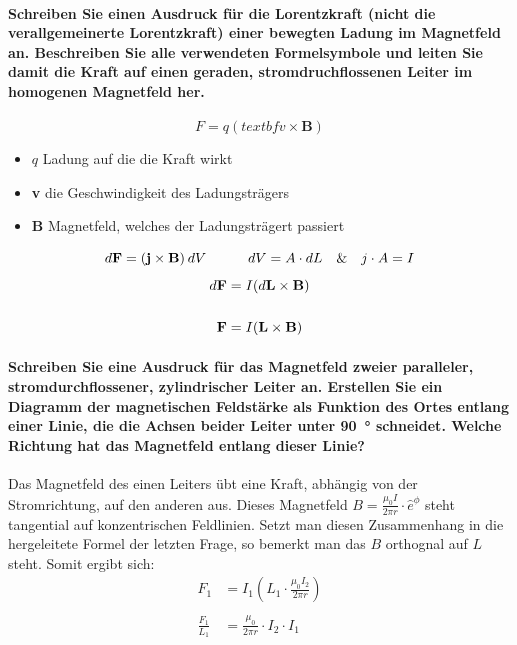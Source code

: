 \documentclass[a4paper, 11pt, parskip=half]{scrartcl}
\begin{document}
\paragraph{Schreiben Sie einen Ausdruck für die Lorentzkraft (nicht die verallgemeinerte
Lorentzkraft) einer bewegten Ladung im Magnetfeld an. Beschreiben Sie alle verwendeten Formelsymbole
und leiten Sie damit die Kraft auf einen geraden, stromdruchflossenen Leiter im homogenen Magnetfeld
her.}
\begin{equation}
    F = q(textbf{v} \times \textbf{B})
\end{equation}
\begin{itemize}
    \item $q$ Ladung auf die die Kraft wirkt 
    \item \textbf{v} die Geschwindigkeit des Ladungsträgers
    \item \textbf{B} Magnetfeld, welches der Ladungsträgert passiert
\end{itemize}
\begin{equation}
    d\textbf{F} = (\textbf{j} \times \textbf{B})\hspace{0.2em} dV \hspace{3em} dV = A\cdot dL \hspace{1em}\& \hspace{1em} j \cdot A = I
\end{equation}
\begin{align}
    d\textbf{F} &= I (d\textbf{L} \times \textbf{B})  \\
    \notag \\ 
    \textbf{F} &= I (\textbf{L} \times \textbf{B})
\end{align}
\paragraph{Schreiben Sie eine Ausdruck für das Magnetfeld zweier paralleler, stromdurchflossener,
zylindrischer Leiter an. Erstellen Sie ein Diagramm der magnetischen Feldstärke als Funktion des
Ortes entlang einer Linie, die die Achsen beider Leiter unter \SI{90}{\degree} schneidet. Welche
Richtung hat das Magnetfeld entlang dieser Linie?}
Das Magnetfeld des einen Leiters übt eine Kraft, abhängig von der Stromrichtung, auf den anderen aus.
Dieses Magnetfeld  $B = \frac{\mu_0 I}{2 \pi r} \cdot \hat{e}^{\phi}$ steht tangential auf konzentrischen Feldlinien.
Setzt man diesen Zusammenhang in die hergeleitete Formel der letzten Frage, so bemerkt man das $B$ orthognal auf $L$ steht. 
Somit ergibt sich:
\begin{align}
    F_1 &= I_1(L_1 \cdot \frac{\mu_0 I_2}{2 \pi r} ) \\
    \\
    \frac{F_1}{L_1} &= \frac{\mu_0}{2 \pi r} \cdot I_2 \cdot I_1
\end{align}
\end{document}
